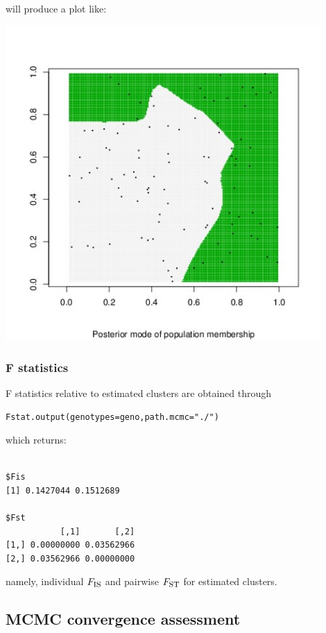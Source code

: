 \documentclass[a4paper,10pt]{article}
\newcommand{\Fst}{F_{\mbox{\footnotesize ST}}}
\newcommand{\Fis}{F_{\mbox{\footnotesize IS}}}
\begin{document}
will produce a plot like:

\includegraphics[width=12cm]{fig/map.jpeg}

\subsubsection{F statistics}
F statistics relative to estimated clusters are obtained through

\begin{verbatim}
Fstat.output(genotypes=geno,path.mcmc="./")
\end{verbatim}



which returns:

\begin{verbatim}

$Fis
[1] 0.1427044 0.1512689

$Fst
           [,1]       [,2]
[1,] 0.00000000 0.03562966
[2,] 0.03562966 0.00000000
\end{verbatim}



namely, individual  $\Fis$ and pairwise $\Fst$ for estimated clusters.



\subsection{MCMC convergence assessment}
\end{document}
